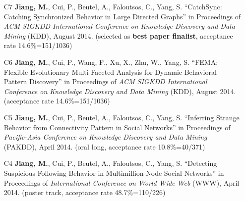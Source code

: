 \documentclass[10pt]{article}
\newenvironment{myindentpar}[1]%
{\begin{list}{}%
         {\setlength{\leftmargin}{#1}}%
         \item[]%
}
{\end{list}}
\newcounter{list}
\begin{document}
\begin{myindentpar}{0.00cm}
\begin{enumerate}[leftmargin=.5cm]
\vspace{-0.1cm}

\item[C7] \textbf{Jiang, M.}, Cui, P., Beutel, A., Faloutsos, C., Yang, S. ``CatchSync: Catching Synchronized Behavior in Large Directed Graphs'' in Proceedings of \emph{ACM SIGKDD International Conference on Knowledge Discovery and Data Mining} (KDD), August 2014. (selected as \textbf{best paper finalist}, acceptance rate 14.6\%=151/1036)

\vspace{-0.1cm}

\item[C6] \textbf{Jiang, M.}, Cui, P., Wang, F., Xu, X., Zhu, W., Yang, S. ``FEMA: Flexible Evolutionary Multi-Faceted Analysis for Dynamic Behavioral Pattern Discovery'' in Proceedings of \emph{ACM SIGKDD International Conference on Knowledge Discovery and Data Mining} (KDD), August 2014. (acceptance rate 14.6\%=151/1036)

\vspace{-0.1cm}

\item[C5] \textbf{Jiang, M.}, Cui, P., Beutel, A., Faloutsos, C., Yang, S. ``Inferring Strange Behavior from Connectivity Pattern in Social Networks'' in Proceedings of \emph{Pacific-Asia Conference on Knowledge Discovery and Data Mining } (PAKDD), April 2014. (oral long, acceptance rate 10.8\%=40/371)

\vspace{-0.1cm}

\item[C4] \textbf{Jiang, M.}, Cui, P., Beutel, A., Faloutsos, C., Yang, S. ``Detecting Suspicious Following Behavior in Multimillion-Node Social Networks'' in Proceedings of \emph{International Conference on World Wide Web} (WWW), April 2014. (poster track, acceptance rate 48.7\%=110/226)


\end{enumerate}
\end{myindentpar}
\end{document}
